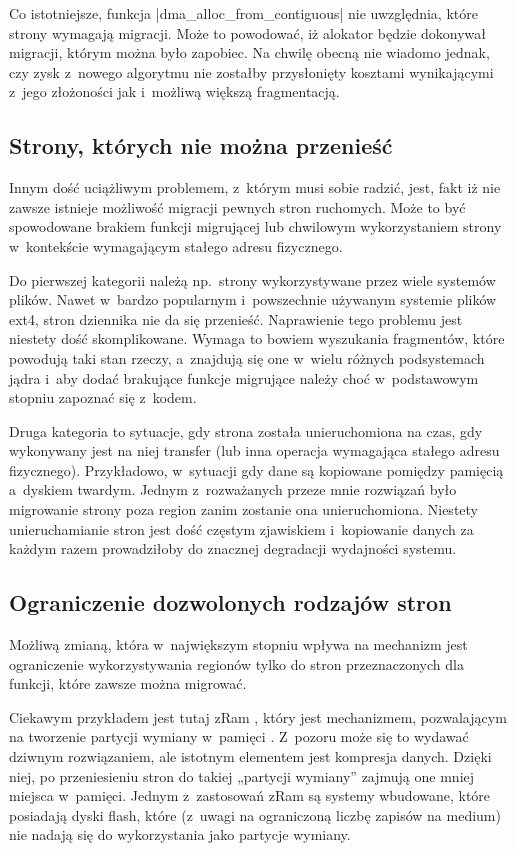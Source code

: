 Co istotniejsze, funkcja \code|dma_alloc_from_contiguous| nie
uwzględnia, które strony wymagają migracji.  Może to powodować, iż
alokator będzie dokonywał migracji, którym można było zapobiec.  Na
chwilę obecną nie wiadomo jednak, czy zysk z~nowego algorytmu nie
zostałby przysłonięty kosztami wynikającymi z~jego złożoności jak
i~możliwą większą fragmentacją.

\subsection{Strony, których nie można przenieść}

Innym dość uciążliwym problemem, z~którym  musi sobie radzić, jest,
fakt iż nie zawsze istnieje możliwość migracji pewnych stron
ruchomych.  Może to być spowodowane brakiem funkcji migrującej lub
chwilowym wykorzystaniem strony w~kontekście wymagającym stałego
adresu fizycznego.

Do pierwszej kategorii należą np.\ strony wykorzystywane przez wiele
systemów plików.  Nawet w~bardzo popularnym i~powszechnie używanym
systemie plików ext4, stron dziennika nie da się przenieść.
Naprawienie tego problemu jest niestety dość skomplikowane.  Wymaga to
bowiem wyszukania fragmentów, które powodują taki stan rzeczy,
a~znajdują się one w~wielu różnych podsystemach jądra i~aby dodać
brakujące funkcje migrujące należy choć w~podstawowym stopniu zapoznać
się z~kodem.

Druga kategoria to sytuacje, gdy strona została unieruchomiona na
czas, gdy wykonywany jest na niej transfer  (lub inna operacja
wymagająca stałego adresu fizycznego).  Przykładowo, w~sytuacji gdy
dane są kopiowane pomiędzy pamięcią a~dyskiem twardym.  Jednym
z~rozważanych przeze mnie rozwiązań było migrowanie strony poza region
 zanim zostanie ona unieruchomiona.  Niestety unieruchamianie stron
jest dość częstym zjawiskiem i~kopiowanie danych za każdym razem
prowadziłoby do znacznej degradacji wydajności systemu.


\subsection{Ograniczenie dozwolonych rodzajów stron}

Możliwą zmianą, która w~największym stopniu wpływa na mechanizm 
jest ograniczenie wykorzystywania regionów  tylko do stron
przeznaczonych dla funkcji, które zawsze można migrować.

Ciekawym przykładem jest tutaj zRam \autocite{patch:zram}, który jest
mechanizmem, pozwalającym na tworzenie partycji wymiany w~pamięci .
Z~pozoru może się to wydawać dziwnym rozwiązaniem, ale istotnym
elementem jest kompresja danych.  Dzięki niej, po przeniesieniu stron
do takiej „partycji wymiany” zajmują one mniej miejsca w~pamięci.
Jednym z~zastosowań zRam są systemy wbudowane, które posiadają dyski
flash, które (z~uwagi na ograniczoną liczbę zapisów na medium) nie
nadają się do wykorzystania jako partycje wymiany.

